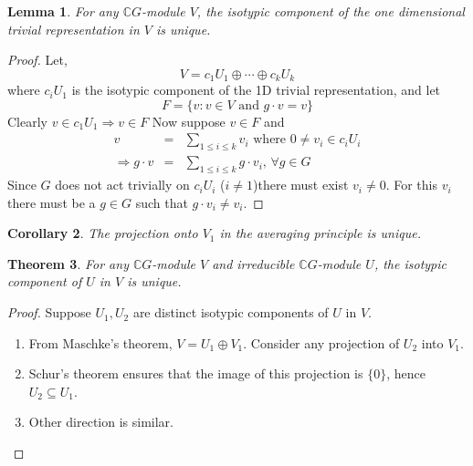 \documentclass{sig-alternate}
\newtheorem{theorem}{Theorem}[section]
\newtheorem{lemma}[theorem]{Lemma}
\newtheorem{corollary}[theorem]{Corollary}
\begin{document}
\begin{lemma}
For any $\mathbb{C}G$-module $V$, the isotypic component of the one dimensional trivial representation in $V$ is unique.
\end{lemma}
\begin{proof}
Let,
\[ V = c_1U_1 \oplus \cdots \oplus c_kU_k \]
where $c_iU_1$ is the isotypic component of the 1D trivial representation, and let
\[ F = \{v : v\in V \mbox{ and } g\cdot v = v\}\]
Clearly $v\in c_1U_1 \Rightarrow v\in F$
Now suppose $v\in F$ and
\begin{eqnarray*}
v & = & \sum_{1\leq i\leq k} v_i \mbox{  where } 0\neq v_i \in c_iU_i \\
\Rightarrow g\cdot v & = & \sum_{1\leq i\leq k} g\cdot v_i  \mbox{, }\forall g\in G
\end{eqnarray*}
Since $G$ does not act trivially on $c_iU_i$ ($i\ne 1$)there must exist $v_i \neq 0$. For this $v_i$ there must be a $g\in G$ such that $g\cdot v_i \neq v_i$. 
\end{proof}
\begin{corollary}
The projection onto $V_1$ in the averaging principle is unique.
\end{corollary}

\begin{theorem}
For any $\mathbb{C}G$-module $V$ and irreducible $\mathbb{C}G$-module $U$, the isotypic component of $U$ in $V$ is unique.
\end{theorem}
\begin{proof}
Suppose $U_1, U_2$ are distinct isotypic components of $U$ in $V$.
\begin{enumerate}
\item From Maschke's theorem, $V = U_1 \oplus V_1$. Consider any projection of $U_2$ into $V_1$.
\item Schur's theorem ensures that the image of this projection is $\{0\}$, hence $U_2 \subseteq U_1$.
\item Other direction is similar.
\end{enumerate}
\end{proof}
\end{document}
